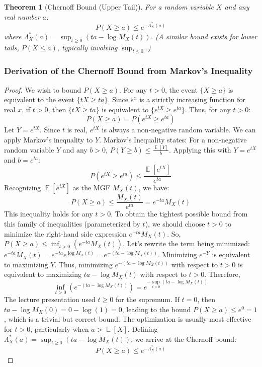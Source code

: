 \documentclass[11pt, letterpaper]{article}
\theoremstyle{plain} %
\newtheorem{theorem}{Theorem}[section] %
\theoremstyle{definition} %
\theoremstyle{remark} %
\DeclareMathOperator{\E}{\mathbb{E}}
\begin{document}
\begin{theorem}[Chernoff Bound (Upper Tail)]
For a random variable $X$ and any real number $a$:
\[ P(X \ge a) \le e^{-\Lambda_X^*(a)} \]
where $\Lambda_X^*(a) = \sup_{t \ge 0} (ta - \log M_X(t))$.
(A similar bound exists for lower tails, $P(X \le a)$, typically involving $\sup_{t \le 0}$.)
\end{theorem}

\subsubsection{Derivation of the Chernoff Bound from Markov's Inequality}
\begin{proof}
We wish to bound $P(X \ge a)$.
For any $t > 0$, the event $\{X \ge a\}$ is equivalent to the event $\{tX \ge ta\}$.
Since $e^x$ is a strictly increasing function for real $x$, if $t>0$, then $\{tX \ge ta\}$ is equivalent to $\{e^{tX} \ge e^{ta}\}$.
Thus, for any $t > 0$:
\[ P(X \ge a) = P(e^{tX} \ge e^{ta}) \]
Let $Y = e^{tX}$. Since $t$ is real, $e^{tX}$ is always a non-negative random variable. We can apply Markov's inequality to $Y$.
Markov's Inequality states: For a non-negative random variable $Y$ and any $b > 0$, $P(Y \ge b) \le \frac{\E[Y]}{b}$.
Applying this with $Y = e^{tX}$ and $b = e^{ta}$:
\[ P(e^{tX} \ge e^{ta}) \le \frac{\E[e^{tX}]}{e^{ta}} \]
Recognizing $\E[e^{tX}]$ as the MGF $M_X(t)$, we have:
\[ P(X \ge a) \le \frac{M_X(t)}{e^{ta}} = e^{-ta} M_X(t) \]
This inequality holds for any $t > 0$. To obtain the tightest possible bound from this family of inequalities (parameterized by $t$), we should choose $t > 0$ to minimize the right-hand side expression $e^{-ta} M_X(t)$.
So, $P(X \ge a) \le \inf_{t > 0} (e^{-ta} M_X(t))$.
Let's rewrite the term being minimized:
$e^{-ta} M_X(t) = e^{-ta} e^{\log M_X(t)} = e^{-(ta - \log M_X(t))}$.
Minimizing $e^{-Y}$ is equivalent to maximizing $Y$. Thus, minimizing $e^{-(ta - \log M_X(t))}$ with respect to $t>0$ is equivalent to maximizing $ta - \log M_X(t)$ with respect to $t>0$.
Therefore,
\[ \inf_{t > 0} (e^{-(ta - \log M_X(t))}) = e^{- \sup_{t > 0} (ta - \log M_X(t))} \]
The lecture presentation used $t \ge 0$ for the supremum. If $t=0$, then $ta - \log M_X(0) = 0 - \log(1) = 0$, leading to the bound $P(X \ge a) \le e^0 = 1$, which is a trivial but correct bound. The optimization is usually most effective for $t>0$, particularly when $a > \E[X]$.
Defining $\Lambda_X^*(a) = \sup_{t \ge 0} (ta - \log M_X(t))$, we arrive at the Chernoff bound:
\[ P(X \ge a) \le e^{-\Lambda_X^*(a)} \]
\end{proof}
\end{document}
